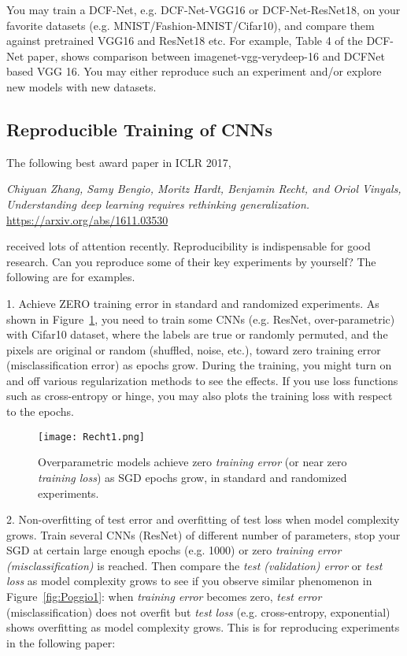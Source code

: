 \documentclass[11pt]{article}
\begin{document}
You may train a DCF-Net, e.g. DCF-Net-VGG16 or DCF-Net-ResNet18, on your favorite datasets (e.g. MNIST/Fashion-MNIST/Cifar10), and compare them against pretrained VGG16 and ResNet18 etc. For example, Table 4 of the DCF-Net paper, shows comparison between imagenet-vgg-verydeep-16 and DCFNet based VGG 16. You may either reproduce such an experiment and/or explore new models with new datasets. 

\subsection{Reproducible Training of CNNs} 

The following best award paper in ICLR 2017, 

\emph{Chiyuan Zhang, Samy Bengio, Moritz Hardt, Benjamin Recht, and Oriol Vinyals, Understanding deep learning requires rethinking generalization.} \url{https://arxiv.org/abs/1611.03530}

\noindent received lots of attention recently. Reproducibility is indispensable for good research. Can you reproduce some of their key experiments by yourself? The following are for examples. 

1. Achieve ZERO training error in standard and randomized experiments. As shown in Figure~\ref{fig:Recht1}, you need to train some CNNs (e.g. ResNet, over-parametric) with Cifar10 dataset, where the labels are true or randomly permuted, and the pixels are original or random (shuffled, noise, etc.), toward zero training error (misclassification error) as epochs grow. During the training, you might turn on and off various regularization methods to see the effects. If you use loss functions such as cross-entropy or hinge, you may also plots the training loss with respect to the epochs. 
\begin{figure}
\begin{centering}
\texttt{[image: Recht1.png]}  
\caption{Overparametric models achieve zero \emph{training error} (or near zero \emph{training loss}) as SGD epochs grow, in standard and randomized experiments.}
\label{fig:Recht1}
\end{centering}
\end{figure}

2. Non-overfitting of test error and overfitting of test loss when model complexity grows. Train several CNNs (ResNet) of different number of parameters, stop your SGD at certain large enough epochs (e.g. 1000) or zero \emph{training error (misclassification)} is reached. Then compare the \emph{test (validation) error} or \emph{test loss} as model complexity grows to see if you observe similar phenomenon in Figure~\ref{fig:Poggio1}: when \emph{training error} becomes zero, \emph{test error} (misclassification) does not overfit but \emph{test loss} (e.g. cross-entropy, exponential) shows overfitting as model complexity grows. This is for reproducing experiments in the following paper: 
\end{document}
